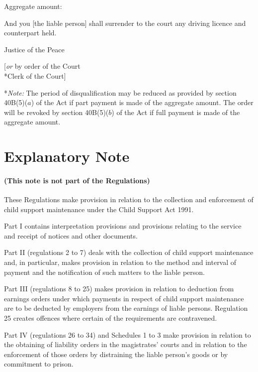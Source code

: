 \documentclass[12pt,a4paper]{article}
\begin{document}
\medskip

Aggregate amount:

\medskip

And you [the liable person] shall surrender to the court any driving licence and counterpart held.

\medskip

{\raggedleft Justice of the Peace

\medskip

[\emph{or} by order of the Court\\*Clerk of the Court]

}

\medskip

*\emph{Note:} The period of disqualification may be reduced as provided by section 40B(5)($a$) of the Act if part payment is made of the aggregate amount.  The order will be revoked by section 40B(5)($b$) of the Act if full payment is made of the aggregate amount.

\part{Explanatory Note}

\renewcommand\parthead{--- Explanatory Note}

\subsection*{(This note is not part of the Regulations)}

 These Regulations make provision in relation to the collection and enforcement of child support maintenance under the Child Support Act 1991.

  Part I contains interpretation provisions and provisions relating to the service and receipt of notices and other documents.

  Part II (regulations 2 to 7) deals with the collection of child support maintenance and, in particular, makes provision in relation to the method and interval of payment and the notification of such matters to the liable person.

  Part III (regulations 8 to 25) makes provision in relation to deduction from earnings orders under which payments in respect of child support maintenance are to be deducted by employers from the earnings of liable persons. Regulation 25 creates offences where certain of the requirements are contravened.

  Part IV (regulations 26 to 34) and Schedules 1 to 3 make provision in relation to the obtaining of liability orders in the magistrates' courts and in relation to the enforcement of those orders by distraining the liable person’s goods or by commitment to prison.
\end{document}
